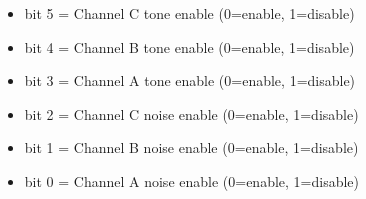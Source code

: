 \begin{itemize}
\item bit 5 = Channel C tone enable (0=enable, 1=disable)
\item bit 4 = Channel B tone enable (0=enable, 1=disable)
\item bit 3 = Channel A tone enable (0=enable, 1=disable)
\item bit 2 = Channel C noise enable (0=enable, 1=disable)
\item bit 1 = Channel B noise enable (0=enable, 1=disable)
\item bit 0 = Channel A noise enable (0=enable, 1=disable)
\end{itemize}

